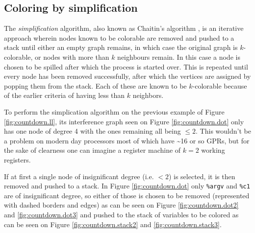 \documentclass{article}
\begin{document}
\subsection{Coloring by simplification}

The \textit{simplification} algorithm, also known as Chaitin's algorithm \cite{chaitin}, 
 is an iterative approach wherein nodes known to be colorable are removed and pushed to a stack until either an empty graph remains, in which case the original graph is \(k\)-colorable,  or nodes with more than \(k\) neighbours remain.
In this case a node is chosen to be spilled after which the process is started over. This is repeated until every node has been removed successfully, after which the vertices are assigned by popping them from the stack. Each of these are known to be \(k\)-colorable because of the earlier criteria of having less than \(k\) neighbors.



To perform the simplication algorithm on the previous example of Figure \ref{fig:countdown.ll}, its interference graph seen on Figure \ref{fig:countdown.dot} only has one node of degree 4 with the ones remaining all being \(\leq 2\). This wouldn't be a problem on modern day processors most of which have \textasciitilde 16 or so GPRs, but for the sake of clearness one can imagine a register machine of \(k=2\) working registers.

If at first a single node of insignificant degree (i.e. \(< 2\)) is selected, it is then removed and pushed to a stack. In Figure \ref{fig:countdown.dot} only \texttt{\%argv} and \texttt{\%c1} are of insignificant degree, so either of those is chosen to be removed (represented with dashed borders and edges) as can be seen on Figure \ref{fig:countdown.dot2} and \ref{fig:countdown.dot3} and pushed to the stack of variables to be colored as can be seen on Figure \ref{fig:countdown.stack2} and \ref{fig:countdown.stack3}.
\end{document}
